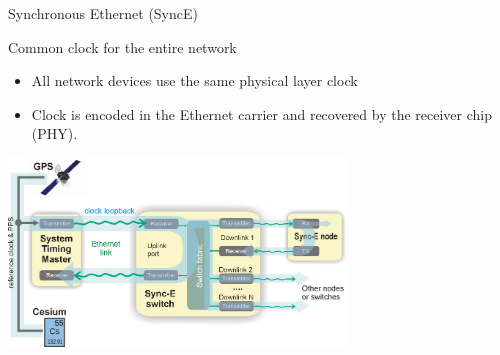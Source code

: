\documentclass[compress,red]{beamer}
\begin{document}
\begin{frame}{Synchronous Ethernet (SyncE)}

 \begin{block}{Common clock for the entire network}
    \begin{itemize}
	 \item All network devices use the same physical layer clock
	 \item Clock is encoded in the Ethernet carrier and recovered by the receiver chip (PHY).
    \end{itemize}
\end{block}

\vspace{-0.2cm}

\begin{center}
\includegraphics[height=5cm]{../../figures/misc/synce.pdf}
\end{center}

\end{frame}
\end{document}
